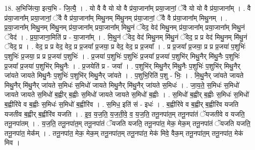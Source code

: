 \documentclass[17pt]{extarticle}
\begin{document}
18. अ॒भिजि॑त्या॒ इत्य॒भि - जि॒त्यै॒ । . यो वै वै यो यो वै प्र॑या॒जाना᳚म् प्रया॒जानां॒ ॅवै यो यो वै प्र॑या॒जाना᳚म् । . वै प्र॑या॒जाना᳚म् प्रया॒जानां॒ ॅवै वै प्र॑या॒जाना᳚म् मिथु॒नम् मि॑थु॒नम् प्र॑या॒जानां॒ ॅवै वै प्र॑या॒जाना᳚म् मिथु॒नम् । . प्र॒या॒जाना᳚म् मिथु॒नम् मि॑थु॒नम् प्र॑या॒जाना᳚म् प्रया॒जाना᳚म् मिथु॒नं ॅवेद॒ वेद॑ मिथु॒नम् प्र॑या॒जाना᳚म् प्रया॒जाना᳚म् मिथु॒नं ॅवेद॑ । . प्र॒या॒जाना॒मिति॑ प्र - या॒जाना᳚म् । . मि॒थु॒नं ॅवेद॒ वेद॑ मिथु॒नम् मि॑थु॒नं ॅवेद॒ प्र प्र वेद॑ मिथु॒नम् मि॑थु॒नं ॅवेद॒ प्र । . वेद॒ प्र प्र वेद॒ वेद॒ प्र प्र॒जया᳚ प्र॒जया॒ प्र वेद॒ वेद॒ प्र प्र॒जया᳚ । . प्र प्र॒जया᳚ प्र॒जया॒ प्र प्र प्र॒जया॑ प॒शुभिः॑ प॒शुभिः॑ प्र॒जया॒ प्र प्र प्र॒जया॑ प॒शुभिः॑ । . प्र॒जया॑ प॒शुभिः॑ प॒शुभिः॑ प्र॒जया᳚ प्र॒जया॑ प॒शुभि॑र् मिथु॒नैर् मि॑थु॒नैः प॒शुभिः॑ प्र॒जया᳚ प्र॒जया॑ प॒शुभि॑र् मिथु॒नैः । . प्र॒जयेति॑ प्र - जया᳚ । . प॒शुभि॑र् मिथु॒नैर् मि॑थु॒नैः प॒शुभिः॑ प॒शुभि॑र् मिथु॒नैर् जा॑यते जायते मिथु॒नैः प॒शुभिः॑ प॒शुभि॑र् मिथु॒नैर् जा॑यते । . प॒शुभि॒रिति॑ प॒शु - भिः॒ । . मि॒थु॒नैर् जा॑यते जायते मिथु॒नैर् मि॑थु॒नैर् जा॑यते स॒मिधः॑ स॒मिधो॑ जायते मिथु॒नैर् मि॑थु॒नैर् जा॑यते स॒मिधः॑ । . जा॒य॒ते॒ स॒मिधः॑ स॒मिधो॑ जायते जायते स॒मिधो॑ ब॒ह्वीर् ब॒ह्वीः स॒मिधो॑ जायते जायते स॒मिधो॑ ब॒ह्वीः । . स॒मिधो॑ ब॒ह्वीर् ब॒ह्वीः स॒मिधः॑ स॒मिधो॑ ब॒ह्वीरि॑वे व ब॒ह्वीः स॒मिधः॑ स॒मिधो॑ ब॒ह्वीरि॑व । . स॒मिध॒ इति॑ सं - इधः॑ । . ब॒ह्वीरि॑वे व ब॒ह्वीर् ब॒ह्वीरि॑व यजति यजतीव ब॒ह्वीर् ब॒ह्वीरि॑व यजति । . इ॒व॒ य॒ज॒ति॒ य॒ज॒ती॒वे॒ व॒ य॒ज॒ति॒ तनू॒नपा॑त॒म् तनू॒नपा॑तं ॅयजतीवे व यजति॒ तनू॒नपा॑तम् । . य॒ज॒ति॒ तनू॒नपा॑त॒म् तनू॒नपा॑तं ॅयजति यजति॒ तनू॒नपा॑त॒ मेक॒ मेक॒म् तनू॒नपा॑तं ॅयजति यजति॒ तनू॒नपा॑त॒ मेक᳚म् । . तनू॒नपा॑त॒ मेक॒ मेक॒म् तनू॒नपा॑त॒म् तनू॒नपा॑त॒ मेक॑ मिवे॒ वैक॒म् तनू॒नपा॑त॒म् तनू॒नपा॑त॒ मेक॑ मिव । \newline
\end{document}
